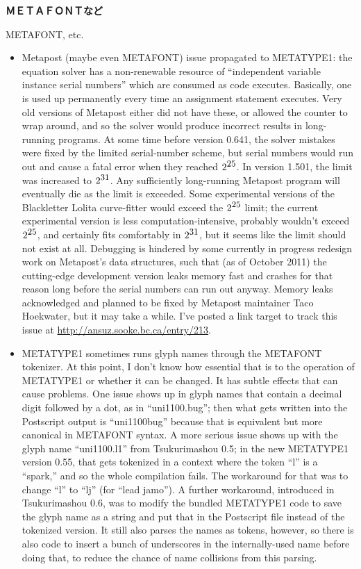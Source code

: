 \documentclass[14pt]{extarticle}
\newcommand{\blsubsubsection}[2]{%
\kaku\bfseries#1\qquad\phantomsection%
\addcontentsline{toc}{subsubsection}{#1 #2}%
#2\mdseries\par\addpenalty{-300}}
\begin{document}
\blsubsubsection{ＭＥＴＡＦＯＮＴなど}{METAFONT, etc.}

\begin{itemize}
  \item Metapost (maybe even METAFONT) issue propagated to METATYPE1:
    the equation solver has a non-renewable resource of ``independent
    variable instance serial numbers'' which are consumed as code executes. 
    Basically, one is used up permanently every time an assignment statement
    executes.  Very old versions of Metapost either did not have these, or
    allowed the counter to wrap around, and so the solver would produce
    incorrect results in long-running programs.  At some time before
    version 0.641, the solver
    mistakes were fixed by the limited serial-number scheme, but
    serial numbers would run out and cause a fatal error when they reached
    $\textrm{2}^\textrm{\small 25}$.  In version 1.501, the limit was
    increased to $\textrm{2}^\textrm{\small 31}$.  Any sufficiently
    long-running Metapost program will eventually die as the limit is
    exceeded.  Some experimental versions of the Blackletter Lolita
    curve-fitter would exceed the $\textrm{2}^\textrm{\small 25}$ limit; the
    current experimental version is less computation-intensive, probably
    wouldn't exceed $\textrm{2}^\textrm{\small 25}$, and certainly fits
    comfortably in $\textrm{2}^\textrm{\small 31}$, but it seems like the
    limit should not exist at all.  Debugging is hindered by some currently
    in progress redesign work on Metapost's data structures, such that (as
    of October 2011) the cutting-edge development version leaks memory fast
    and crashes for that reason long before the serial numbers can run out
    anyway.  Memory leaks acknowledged and planned to be fixed by Metapost
    maintainer Taco Hoekwater, but it may take a while.  I've posted a link
    target to track this issue at \url{http://ansuz.sooke.bc.ca/entry/213}.

  \item METATYPE1 sometimes runs glyph names through the METAFONT
    tokenizer.  At this point, I don't know how essential that is to
    the operation of METATYPE1 or whether it can be changed.  It has
    subtle effects that can cause problems.  One issue shows up in
    glyph names that contain a decimal digit followed by a dot, as in
    ``uni1100.bug''; then what gets written into the Postscript output
    is ``uni1100bug'' because that is equivalent but more canonical in
    METAFONT syntax.  A more serious issue shows up with the glyph name
    ``uni1100.l1'' from Tsukurimashou 0.5; in the new METATYPE1 version
    0.55, that gets tokenized in a context where the token ``l'' is a
    ``spark,'' and so the whole compilation fails.  The workaround
    for that was to change ``l'' to ``lj'' (for ``lead jamo'').  A further
    workaround, introduced in Tsukurimashou 0.6, was to modify the bundled
    METATYPE1 code to save the glyph name as a string and put that in the
    Postscript file instead of the tokenized version.  It still also parses
    the names as tokens, however, so there is also code to insert a bunch of
    underscores in the internally-used name before doing that, to reduce the
    chance of name collisions from this parsing.


\end{itemize}
\end{document}
